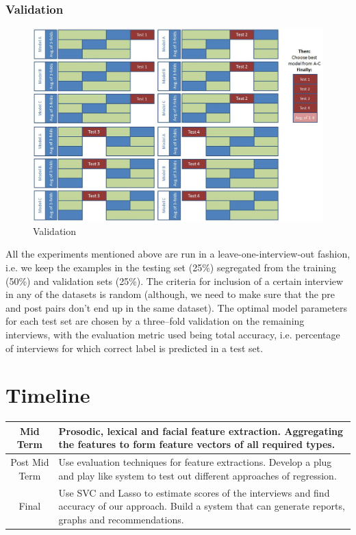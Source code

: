 \documentclass[11pt]{article}
\begin{document}
\subsubsection{Validation}
\begin{figure}[h!]
\begin{center}
\includegraphics[width=0.6\columnwidth]{figures/validation.jpeg}
\caption{Validation}
\label{fig:methodology}
\end{center}
\end{figure}
All the experiments mentioned above are run in a leave-one-interview-out fashion, i.e. we keep the examples in the testing set (25\%) segregated from the training (50\%) and validation sets (25\%). The criteria for inclusion of a certain interview in any of the datasets is random (although, we need to make sure that the pre and post pairs don’t end up in the same dataset). The optimal model parameters for each test set are chosen by a three–fold validation on the remaining interviews, with the evaluation metric used being total accuracy, i.e. percentage of interviews for which correct label is predicted in a test set.

\section{Timeline}
\begin{table}[h!]
    \begin{tabular}{ | c | p{13cm} | }
	\hline
        Mid Term & Prosodic, lexical and facial feature extraction. \newline Aggregating the features to form feature vectors of all required types. \newline \\
	\hline
        Post Mid Term &  Use evaluation techniques for feature extractions. \newline Develop a plug and play like system to test out different approaches of regression.\newline \\ 
        \hline
        Final & Use SVC and Lasso to estimate scores of the interviews and find accuracy of our approach. \newline Build a system that can generate reports, graphs and recommendations.\newline \\ 
        \hline
    \end{tabular} 
\end{table}
\end{document}
